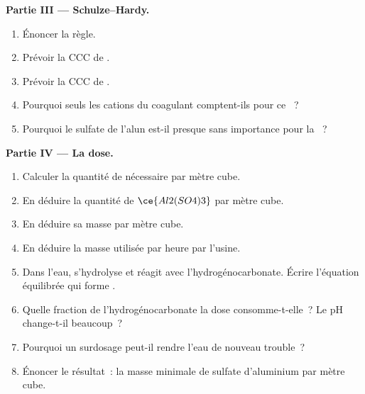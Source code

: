 \begin{problem}
\medskip\noindent\textbf{Partie III --- Schulze--Hardy.}
\begin{enumerate}[resume]
  \item Énoncer la règle.
  \item Prévoir la CCC de .
  \item Prévoir la CCC de .
  \item Pourquoi seuls les cations du coagulant comptent-ils pour ce
        ~?
  \item Pourquoi le sulfate de l'alun est-il presque sans importance pour
        la ~?
\end{enumerate}

\medskip\noindent\textbf{Partie IV --- La dose.}
\begin{enumerate}[resume]
  \item Calculer la quantité de  nécessaire par mètre cube.
  \item En déduire la quantité de $\ce{Al2(SO4)3}$ par mètre cube.
  \item En déduire sa masse par mètre cube.
  \item En déduire la masse utilisée par heure par l'usine.
  \item Dans l'eau,  s'hydrolyse et réagit avec
        l'hydrogénocarbonate. Écrire l'équation équilibrée qui forme
        .
  \item Quelle fraction de l'hydrogénocarbonate la dose consomme-t-elle~?
        Le pH change-t-il beaucoup~?
  \item Pourquoi un surdosage peut-il rendre l'eau de nouveau trouble~?
  \item Énoncer le résultat~: la masse minimale de sulfate d'aluminium
        par mètre cube.
\end{enumerate}
\end{problem}
